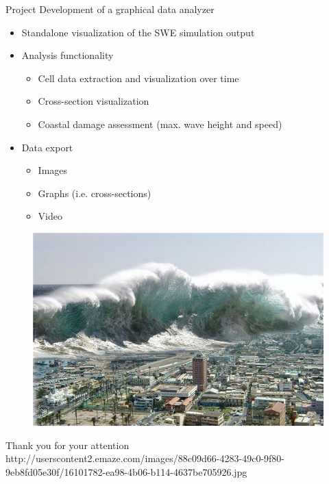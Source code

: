 \documentclass[shortpres,usenames,dvipsnames]{beamer}
\newcommand{\imgfullscale}{0.75}
\begin{document}
\begin{frame}{Project}
	Development of a graphical data analyzer
	\begin{itemize}
		\item Standalone visualization of the SWE simulation output
		\item Analysis functionality
		\begin{itemize}
			\item Cell data extraction and visualization over time
			\item Cross-section visualization
			\item Coastal damage assessment (max. wave height and speed)
		\end{itemize}
		\item Data export
		\begin{itemize}
			\item Images
			\item Graphs (i.e. cross-sections)
			\item Video
		\end{itemize}
	\end{itemize}
\end{frame}

\begin{frame}{}
	\begin{figure}
		\includegraphics[clip, width=\imgfullscale\linewidth]{img/tsunami.jpg}
	\end{figure}
	\centering
	Thank you for your attention
	\\
	\vfill
	\flushleft
	{\fontsize{5}{5} \selectfont http://userscontent2.emaze.com/images/88c09d66-4283-49c0-9f80-9eb8fd05e30f/16101782-ea98-4b06-b114-4637be705926.jpg}
\end{frame}
\end{document}
